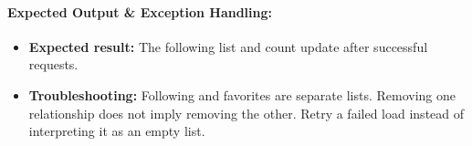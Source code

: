 \paragraph{Expected Output \& Exception Handling:}
\begin{itemize}[leftmargin=1.5em,itemsep=2pt]
  \item \textbf{Expected result:} The following list and count update after successful requests.
  \item \textbf{Troubleshooting:} Following and favorites are separate lists. Removing one relationship does not imply removing the other. Retry a failed load instead of interpreting it as an empty list.
\end{itemize}

